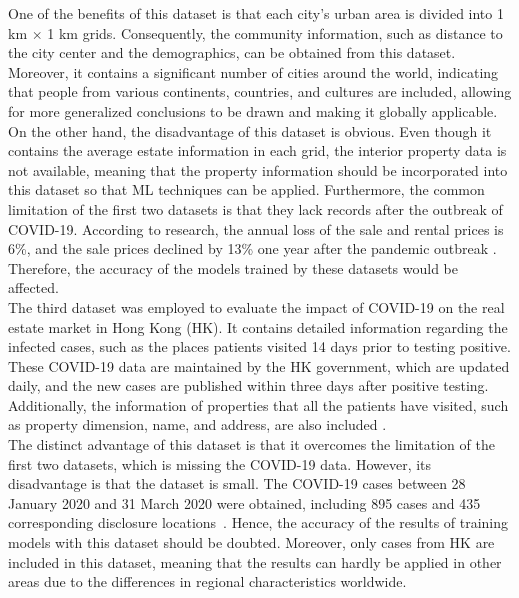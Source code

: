 \documentclass[12pt,twoside]{report}
\begin{document}
One of the benefits of this dataset is that each city's urban area is divided into 1 km $\times$ 1 km grids. Consequently, the community information, such as distance to the city center and the demographics, can be obtained from this dataset. Moreover, it contains a significant number of cities around the world, indicating that people from various continents, countries, and cultures are included, allowing for more generalized conclusions to be drawn and making it globally applicable. 
\\

On the other hand, the disadvantage of this dataset is obvious. Even though it contains the average estate information in each grid, the interior property data is not available, meaning that the property information should be incorporated into this dataset so that ML techniques can be applied. Furthermore, the common limitation of the first two datasets is that they lack records after the outbreak of COVID-19. According to research, the annual loss of the sale and rental prices is 6\%, and the sale prices declined by 13\% one year after the pandemic outbreak \citep{RN29}. Therefore, the accuracy of the models trained by these datasets would be affected. 
\\

The third dataset was employed to evaluate the impact of COVID-19 on the real estate market in Hong Kong (HK). It contains detailed information regarding the infected cases, such as the places patients visited 14 days prior to testing positive. These COVID-19 data are maintained by the HK government, which are updated daily, and the new cases are published within three days after positive testing. Additionally, the information of properties that all the patients have visited, such as property dimension, name, and address, are also included \citep{RN24}.
\\ 

The distinct advantage of this dataset is that it overcomes the limitation of the first two datasets, which is missing the COVID-19 data. However, its disadvantage is that the dataset is small. The COVID-19 cases between 28 January 2020 and 31 March 2020 were obtained, including 895 cases and 435 corresponding disclosure \mbox{locations \citep{RN24}}. Hence, the accuracy of the results of training models with this dataset should be doubted. Moreover, only cases from HK are included in this dataset, meaning that the results can hardly be applied in other areas due to the differences in regional characteristics worldwide. 
\end{document}
